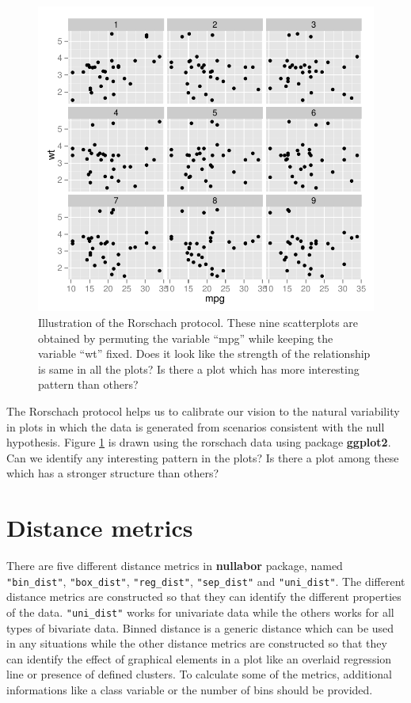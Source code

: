\documentclass[article]{jss}
\begin{document}
\begin{figure}[hbtp]
\begin{center}
\includegraphics[scale=1]{nullabor-rorschach.pdf}
\caption{Illustration of the Rorschach protocol. These nine scatterplots are obtained by permuting the variable ``mpg'' while keeping the variable ``wt'' fixed. Does it look like the strength of the relationship is same in all the plots? Is there a plot which has more interesting pattern than others? }
\label{rorschach}
\end{center}
\end{figure}

The Rorschach protocol helps us to calibrate our vision to the natural variability in plots in which the data is generated from scenarios consistent with the null hypothesis. Figure \ref{rorschach} is drawn using the rorschach data using package \textbf{ggplot2}. Can we identify any interesting pattern in the plots? Is there a plot among these which has a stronger structure than others?

\section{Distance metrics}\label{distance-metrics}

There are five different distance metrics in \textbf{nullabor} package,
named \texttt{"bin\_dist"}, \texttt{"box\_dist"}, \texttt{"reg\_dist"},
\texttt{"sep\_dist"} and \texttt{"uni\_dist"}. The different distance
metrics are constructed so that they can identify the different
properties of the data. \texttt{"uni\_dist"} works for univariate data
while the others works for all types of bivariate data. Binned distance
is a generic distance which can be used in any situations while the
other distance metrics are constructed so that they can identify the
effect of graphical elements in a plot like an overlaid regression line
or presence of defined clusters. To calculate some of the metrics,
additional informations like a class variable or the number of bins
should be provided.
\end{document}
